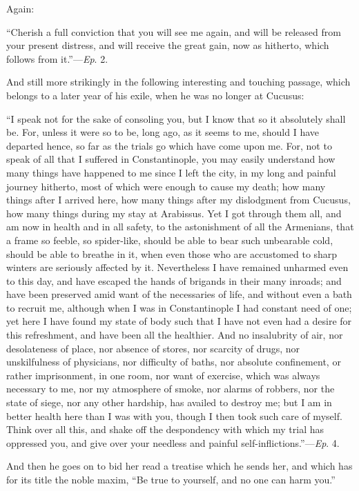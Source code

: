Again:

``Cherish a full conviction that you will see me again, and
will be released from your present distress, and will receive the
great gain, now as hitherto, which follows from it.''—\emph{Ep}.
2.

And still more strikingly in the following interesting and touching
passage, which belongs to a later year of his exile, when he was no
longer at Cucusus:

``I speak not for the sake of consoling you, but I know that so
it absolutely shall be. For, unless it were so to be, long ago, as it
seems to me, should I have departed hence, so far as the trials go
which have come upon me. For, not to speak of all that I suffered in
Constantinople, you may easily understand how many things have
happened to me since I left the city, in my long and painful journey
hitherto, most of which were enough to cause my death; how many things
after I arrived here, how many things after my dislodgment from
Cucusus, how many things during my stay at Arabissus. Yet I got
through them all, and am now in health and in all safety, to the
astonishment of all the Armenians, that a frame so feeble, so
spider-like, should be able to bear such unbearable cold, should be
able to breathe in it, when even those who are accustomed to sharp
winters are seriously affected by it. Nevertheless I have remained
unharmed even to this day, and have escaped the hands of brigands in
their many inroads; and have been preserved amid want of the
necessaries of life, and without even a bath to recruit me, although
when I was in Constantinople I had constant need of one; yet here I
have found my state of body such that I have not even had a desire for
this refreshment, and have been all the healthier. And no insalubrity
of air, nor desolateness of place, nor absence of stores, nor scarcity
of drugs, nor unskilfulness of physicians, nor difficulty of baths,
nor absolute confinement, or rather imprisonment, in one room, nor
want of exercise, which was always necessary to me, nor my atmosphere
of smoke, nor alarms of robbers, nor the state of siege, nor any other
hardship, has availed to destroy me; but I am in better health here
than I was with you, though I then took such care of myself. Think
over all this, and shake off the despondency with which my trial has
oppressed you, and give over your needless and painful
self-inflictions.''—\emph{Ep}. 4.

And then he goes on to bid her read a treatise which he sends her,
and which has for its title the noble maxim, ``Be true to
yourself, and no one can harm you.''


